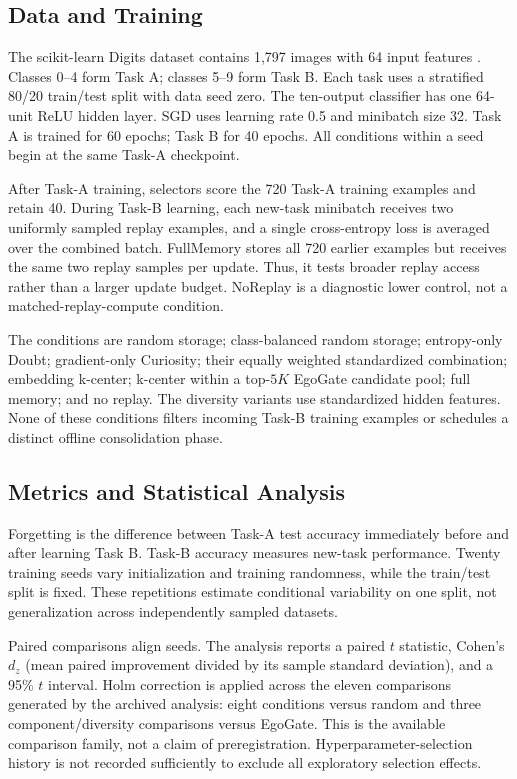 \documentclass[conference]{IEEEtran}
\begin{document}
\subsection{Data and Training}
The scikit-learn Digits dataset contains 1,797 images with 64 input features \cite{digits,sklearn}. Classes 0--4 form Task A; classes 5--9 form Task B. Each task uses a stratified 80/20 train/test split with data seed zero. The ten-output classifier has one 64-unit ReLU hidden layer. SGD uses learning rate 0.5 and minibatch size 32. Task A is trained for 60 epochs; Task B for 40 epochs. All conditions within a seed begin at the same Task-A checkpoint.

After Task-A training, selectors score the 720 Task-A training examples and retain 40. During Task-B learning, each new-task minibatch receives two uniformly sampled replay examples, and a single cross-entropy loss is averaged over the combined batch. FullMemory stores all 720 earlier examples but receives the same two replay samples per update. Thus, it tests broader replay access rather than a larger update budget. NoReplay is a diagnostic lower control, not a matched-replay-compute condition.

The conditions are random storage; class-balanced random storage; entropy-only Doubt; gradient-only Curiosity; their equally weighted standardized combination; embedding k-center; k-center within a top-$5K$ EgoGate candidate pool; full memory; and no replay. The diversity variants use standardized hidden features. None of these conditions filters incoming Task-B training examples or schedules a distinct offline consolidation phase.

\subsection{Metrics and Statistical Analysis}
Forgetting is the difference between Task-A test accuracy immediately before and after learning Task B. Task-B accuracy measures new-task performance. Twenty training seeds vary initialization and training randomness, while the train/test split is fixed. These repetitions estimate conditional variability on one split, not generalization across independently sampled datasets.

Paired comparisons align seeds. The analysis reports a paired $t$ statistic, Cohen's $d_z$ (mean paired improvement divided by its sample standard deviation), and a 95\% $t$ interval. Holm correction \cite{holm} is applied across the eleven comparisons generated by the archived analysis: eight conditions versus random and three component/diversity comparisons versus EgoGate. This is the available comparison family, not a claim of preregistration. Hyperparameter-selection history is not recorded sufficiently to exclude all exploratory selection effects.
\end{document}
